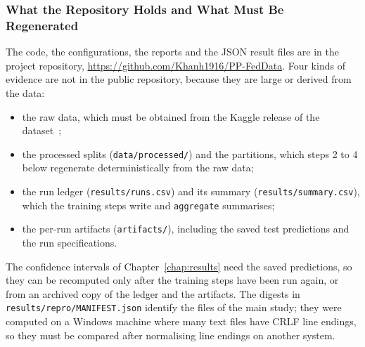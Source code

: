 \subsubsection*{What the Repository Holds and What Must Be Regenerated}
The code, the configurations, the reports and the JSON result files are in the project repository, \url{https://github.com/Khanh1916/PP-FedData}. Four kinds of evidence are not in the public repository, because they are large or derived from the data:
\begin{itemize}
    \item the raw data, which must be obtained from the Kaggle release of the dataset~\cite{alatram2023kaggle};
    \item the processed splits (\texttt{data/processed/}) and the partitions, which steps 2 to 4 below regenerate deterministically from the raw data;
    \item the run ledger (\texttt{results/runs.csv}) and its summary (\texttt{results/summary.csv}), which the training steps write and \texttt{aggregate} summarises;
    \item the per-run artifacts (\texttt{artifacts/}), including the saved test predictions and the run specifications.
\end{itemize}
The confidence intervals of Chapter~\ref{chap:results} need the saved predictions, so they can be recomputed only after the training steps have been run again, or from an archived copy of the ledger and the artifacts. The digests in \texttt{results/repro/MANIFEST.json} identify the files of the main study; they were computed on a Windows machine where many text files have CRLF line endings, so they must be compared after normalising line endings on another system.


